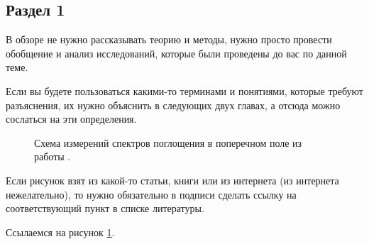 \documentclass[a4paper,14pt]{extarticle}
\begin{document}
\subsection{Раздел 1}

В обзоре не нужно рассказывать теорию и методы, нужно просто провести обобщение и анализ исследований, которые были проведены до вас по данной теме.

Если вы будете пользоваться какими-то терминами и понятиями, которые требуют разъяснения, их нужно объяснить в следующих двух главах, а отсюда можно сослаться на эти определения.

\begin{figure}[ht]
    \begin{center}
    
    \caption{\label{fig:miller2-2}
        Схема измерений спектров поглощения в поперечном поле из работы \cite{Miller2}.}
    \end {center}
    \end {figure}
    
    Если рисунок взят из какой-то статьи, книги или из интернета (из интернета нежелательно), то нужно обязательно в подписи сделать ссылку на соответствующий пункт в списке литературы.

    Ссылаемся на рисунок \ref{fig:miller2-2}.
    
\end{document}
